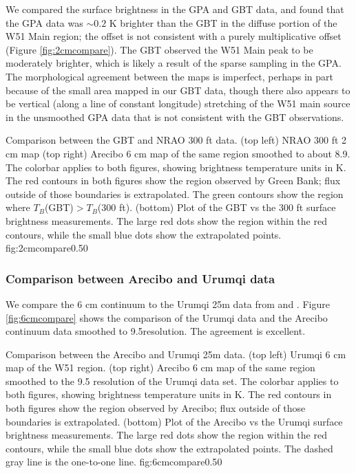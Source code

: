 We compared the surface brightness in the GPA and GBT data, and found that
the GPA data was $\sim0.2$ K brighter than the GBT in the diffuse portion of
the W51 Main region; the offset is not consistent with a purely multiplicative
offset (Figure \ref{fig:2cmcompare}).  The GBT observed the W51 Main peak to be moderately brighter,
which is likely a result of the sparse sampling in the GPA.  The morphological
agreement between the maps is imperfect, perhaps in part because of the small
area mapped in our GBT data, though there also appears to be vertical (along a
line of constant longitude) stretching of the W51 main source in the unsmoothed
GPA data that is not consistent with the GBT observations.

{Comparison between the GBT and NRAO 300 ft \citep{Langston2000a} data.
(top left) NRAO 300 ft 2 cm map
(top right) Arecibo 6 cm map of the same region smoothed to about 8.9\arcmin. 
The colorbar applies to both figures,
showing brightness temperature units in K.  The red contours in both figures
show the region observed by Green Bank; flux outside of those boundaries is
extrapolated.  The green contours show the region where $T_B$(GBT)$>T_B$(300 ft).
(bottom) Plot of the GBT vs the 300 ft surface brightness measurements.
The large red dots show the region within the red contours, while the small
blue dots show the extrapolated points.  
}
{fig:2cmcompare}{0.5}{0}

\subsubsection{Comparison between Arecibo and Urumqi data}
We compare the 6 cm continuum to the Urumqi 25m data from \citet{Sun2007a} and
\citet{Sun2011a}.  Figure \ref{fig:6cmcompare} shows the comparison of the
Urumqi data and the Arecibo continuum data smoothed to 9.5\arcmin resolution.
The agreement is excellent.


{Comparison between the Arecibo and Urumqi 25m \citep{Sun2011b} data.
(top left) Urumqi 6 cm map of the W51 region.
(top right) Arecibo 6 cm map of the same region smoothed to the 9.5\arcmin
resolution of the Urumqi data set.  The colorbar applies to both figures,
showing brightness temperature units in K.  The red contours in both figures
show the region observed by Arecibo; flux outside of those boundaries is
extrapolated.
(bottom) Plot of the Arecibo vs the Urumqi surface brightness measurements.
The large red dots show the region within the red contours, while the small
blue dots show the extrapolated points.  The dashed gray line is the one-to-one
line.
}
{fig:6cmcompare}{0.5}{0}


